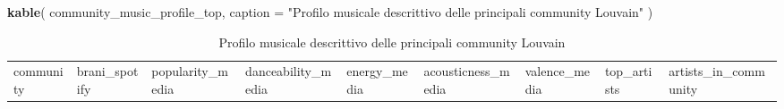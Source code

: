 \documentclass[
]{article}
\newenvironment{Shaded}{\begin{snugshade}}{\end{snugshade}}
\newcommand{\AttributeTok}[1]{\textcolor[rgb]{0.13,0.29,0.53}{#1}}
\newcommand{\FunctionTok}[1]{\textcolor[rgb]{0.13,0.29,0.53}{\textbf{#1}}}
\newcommand{\NormalTok}[1]{#1}
\newcommand{\StringTok}[1]{\textcolor[rgb]{0.31,0.60,0.02}{#1}}
\begin{document}
\begin{Shaded}
\begin{Highlighting}[]
\FunctionTok{kable}\NormalTok{(}
\NormalTok{  community\_music\_profile\_top,}
  \AttributeTok{caption =} \StringTok{"Profilo musicale descrittivo delle principali community Louvain"}
\NormalTok{)}
\end{Highlighting}
\end{Shaded}

\begin{longtable}[]{@{}
  >{\raggedright\arraybackslash}p{}
  >{\raggedleft\arraybackslash}p{}
  >{\raggedleft\arraybackslash}p{}
  >{\raggedleft\arraybackslash}p{}
  >{\raggedleft\arraybackslash}p{}
  >{\raggedleft\arraybackslash}p{}
  >{\raggedleft\arraybackslash}p{}
  >{\raggedright\arraybackslash}p{}
  >{\raggedleft\arraybackslash}p{}@{}}
\caption{Profilo musicale descrittivo delle principali community
Louvain}\tabularnewline
\toprule\noalign{}
\begin{minipage}[b]{\linewidth}\raggedright
community
\end{minipage} & \begin{minipage}[b]{\linewidth}\raggedleft
brani\_spotify
\end{minipage} & \begin{minipage}[b]{\linewidth}\raggedleft
popularity\_media
\end{minipage} & \begin{minipage}[b]{\linewidth}\raggedleft
danceability\_media
\end{minipage} & \begin{minipage}[b]{\linewidth}\raggedleft
energy\_media
\end{minipage} & \begin{minipage}[b]{\linewidth}\raggedleft
acousticness\_media
\end{minipage} & \begin{minipage}[b]{\linewidth}\raggedleft
valence\_media
\end{minipage} & \begin{minipage}[b]{\linewidth}\raggedright
top\_artists
\end{minipage} & \begin{minipage}[b]{\linewidth}\raggedleft
artists\_in\_community
\end{minipage} \\

\end{longtable}
\end{document}
